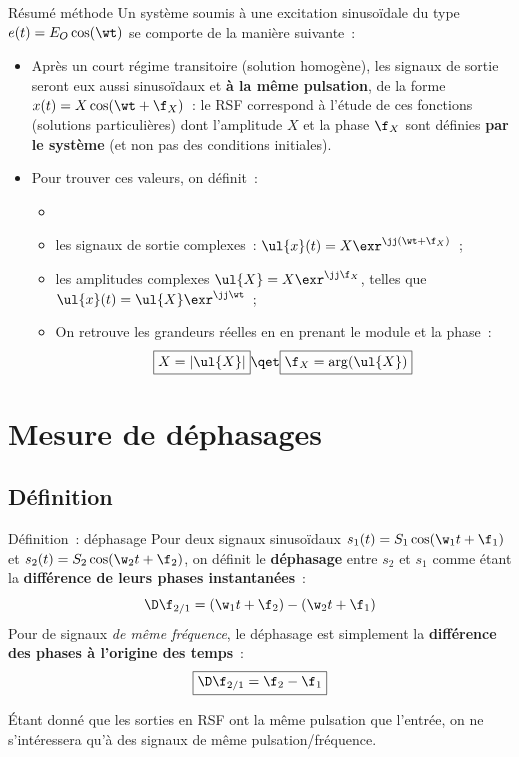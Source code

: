\documentclass[../main/main.tex]{subfiles}
\begin{document}
\begin{rror}{Résumé méthode}
    Un système soumis à une excitation sinusoïdale du type $e(t) = E_O\cos(\wt)$ se
    comporte de la manière suivante~:
    \begin{itemize}
        \item Après un court régime transitoire (solution homogène), les signaux de
            sortie seront eux aussi sinusoïdaux et \textbf{à la même pulsation}, de
            la forme $x(t) = X\cos(\wt+\f_X)$~: le RSF correspond à l'étude de ces
            fonctions (solutions particulières) dont l'amplitude $X$ et la phase
            $\f_X$ sont définies \textbf{par le système} (et non pas des conditions
            initiales).
        \item Pour trouver ces valeurs, on définit~:
            \begin{itemize}
                \item {}
                \item les signaux de sortie complexes~: $\ul{x}(t) =
                    X\exr^{\jj(\wt+\f_X)}$~;
                \item les amplitudes complexes $\ul{X} = X\exr^{\jj\f_X}$,
                    telles que $\ul{x}(t) = \ul{X}\exr^{\jj\wt}$~;
                \item On retrouve les grandeurs réelles en en prenant le module et
                    la phase~:
                    \[ \boxed{X = \left| \ul{X} \right|}
                        \qet
                        \boxed{\f_X = \arg(\ul{X})}
                    \]
            \end{itemize}
    \end{itemize}
\end{rror}

\section{Mesure de déphasages}
\subsection{Définition}
\begin{NCdefi}[width=\linewidth]{Définition~: déphasage}
    Pour deux signaux sinusoïdaux $s_1(t) = S_1\cos(\w_1t+\f_1)$ et $s_2(t) =
    S_2\cos(\w_2t+\f_2)$, on définit le \textbf{déphasage} entre $s_2$ et $s_1$
    comme étant la \textbf{différence de leurs phases instantanées}~:
    \[\D\f_{2/1} = (\w_1t + \f_2) - (\w_2t+\f_1)\]
    Pour de signaux \textit{de même fréquence}, le déphasage est simplement la
    \textbf{différence des phases à l'origine des temps}~:
    \[\boxed{\D\f_{2/1} = \f_2 - \f_1}\]
\end{NCdefi}
\begin{rrapp}{}
    Étant donné que les sorties en RSF ont la même pulsation que l'entrée, on ne
    s'intéressera qu'à des signaux de même pulsation/fréquence.
\end{rrapp}
\end{document}
